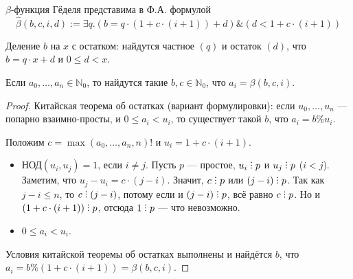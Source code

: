 \begin{theorem}$\beta$-функция Гёделя представима в Ф.А. формулой
$$\hat{\beta}(b,c,i,d) := \exists q.(b = q \cdot (1 + c \cdot (i+1)) + d) \& (d < 1 + c \cdot (i+1))$$
\end{theorem}
Деление $b$ на $x$ с остатком: найдутся частное $(q)$ и остаток $(d)$, что
$b = q\cdot x + d$ и $0 \le d < x$.

\begin{theorem}
    Если $a_0, \dots, a_n \in \mathbb{N}_0$, то найдутся такие $b,c \in \mathbb{N}_0$, что $a_i = \beta(b,c,i)$.
\end{theorem}

\begin{proof}
    Китайская теорема об остатках (вариант формулировки): если $u_0, \dots, u_n$ --- попарно взаимно-просты, и $0 \le a_i < u_i$, то существует такой $b$, что $a_i = b \% u_i$.

Положим $c = \max(a_0,\dots,a_n,n)!$ и $u_i = 1+c\cdot(i+1)$.

\begin{itemize}
\item $\text{НОД}(u_i,u_j) = 1$, если $i \ne j$.
Пусть $p$ --- простое, $u_i\divisible p$ и $u_j\divisible p$ ($i < j$).
Заметим, что $u_j-u_i = c \cdot (j-i)$. Значит, $c\divisible p$ или $(j-i)\divisible p$.
Так как $j-i \le n$, то $c \divisible (j-i)$, потому если и $(j-i)\divisible p$, всё равно $c \divisible p$.
Но и $(1+c\cdot(i+1))\divisible p$, отсюда $1 \divisible p$ --- что невозможно.
\item $0 \le a_i < u_i$.
\end{itemize}
Условия китайской теоремы об остатках выполнены и найдётся $b$, что
$a_i = b \% (1 + c\cdot(i+1)) = \beta(b,c,i)$.
\end{proof}


